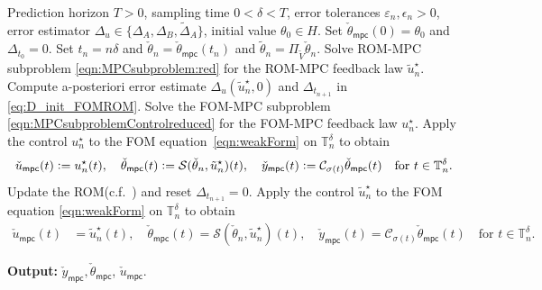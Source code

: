 \documentclass[reqno]{amsart}
\newcommand{\timeInt}{\mathbb{T}}
\newcommand{\state}{\theta}
\newcommand{\inpVar}{u}
\newcommand{\outVar}{y}
\newcommand{\cOper}{\calC}
\newcommand{\errortol}{\epsilon}
\newcommand{\initBoundn}[1]{\Delta_{t_{#1}}}
\newcommand{\optInpVar}[1]{\inpVar_{#1}^\star}
\newcommand{\optInpVarN}{\optInpVar{n}}
\newcommand{\switch}{\sigma}
\newcommand{\reduce}[1]{\tilde{#1}}
\newcommand{\Vred}{\reduce{V}}
\newcommand{\projVred}{\Pi_{\Vred}}
\newcommand{\BoundControlA}{\Delta_{A}}
\newcommand{\BoundControlB}{\Delta_{B}}
\newcommand{\BoundControlAtil}{\tilde\Delta_{A}}
\newcommand{\stateRed}{\reduce{\state}}
\newcommand{\optInpVarRed}[1]{\reduce{\inpVar}_{#1}^\star}
\newcommand{\optInpVarRedN}{\optInpVarRed{n}}
\newcommand{\intermediateState}{\check{\state}}
\newcommand{\intermediateStateMPC}
{\check{\state}_{\mathsf{mpc}}}
\newcommand{\intermediateOutVarMPC}
{\check{\outVar}_{\mathsf{mpc}}}
\newcommand{\intermediateInpVarMPC}
{\check{\inpVar}_{\mathsf{mpc}}}
\newcommand{\calC}{\mathcal{C}}
\newcommand{\calS}{\mathcal{S}}
\newcommand{\abbr}[1]{\textsf{#1}\xspace}
\newcommand{\FOM}{\abbr{FOM}}
\newcommand{\ROM}{\abbr{ROM}}
\newcommand{\MPC}{\abbr{MPC}}
\begin{document}
\begin{algorithm}[t]
	\caption{\FOM-\ROM-\MPC}\label{alg:ROM-MPC}
	\begin{algorithmic}[1]
		\Require Prediction horizon $T>0$, sampling time $0<\delta<T$, error tolerances $\varepsilon_n,\errortol_n>0$, error estimator $\Delta_u\in \{\BoundControlA,\BoundControlB, \BoundControlAtil\}$, initial value $\state_0\in H$.
        \State Set $\intermediateStateMPC(0) = \state_0$ and $\initBoundn{0}= 0$. 
			\State Set $t_n = n\delta$ and $\intermediateState_n = \intermediateStateMPC(t_n)$ and $\stateRed_n = \projVred \intermediateState_n$.\label{line:alg:FOMROMMPC_initvalue}
            \State Solve \ROM-\MPC subproblem \eqref{eqn:MPCsubproblem:red} for the \ROM-\MPC feedback law $\optInpVarRedN$. 
            \State Compute a-posteriori error estimate $\Delta_u(\optInpVarRedN,0)$ and $\initBoundn{n+1}$ in \eqref{eq:D_init_FOMROM}.
            \If{$\Delta_u(\optInpVarRedN,0)>\varepsilon_n$ or $\initBoundn{n+1}>\epsilon_n$}\label{alg:line:ErrorEstCrit}
                 \State Solve the \FOM-\MPC subproblem \eqref{eqn:MPCsubproblemControlreduced} for the \FOM-\MPC feedback law $\optInpVarN$. 
		          \State Apply the control $\optInpVarN$ to the \FOM equation~\eqref{eqn:weakForm} on $\timeInt_n^\delta $ to obtain
                 \begin{align*} \intermediateInpVarMPC(t)\vcentcolon=\optInpVarN{(t)}, \quad\intermediateStateMPC (t)\vcentcolon=\calS(\intermediateState_n,\optInpVarRedN)(t),\quad\intermediateOutVarMPC (t)\vcentcolon=\cOper_{\switch{(t)}} \intermediateStateMPC (t)\quad\text{for }t\in \timeInt_n^\delta.
                \end{align*}
                \State Update the \ROM (c.f.~) and reset $\initBoundn{n+1}=0$.
            \Else
                \State \label{algo:line:applyROM}Apply the control $\optInpVarRedN$ to the \FOM equation \eqref{eqn:weakForm} on $\timeInt_n^\delta$ to obtain 
                \begin{align*}
                    \intermediateInpVarMPC(t)& =\optInpVarRedN (t),\quad \intermediateStateMPC(t)=\calS(\intermediateState_n,\optInpVarRedN)(t), \quad\intermediateOutVarMPC(t)=\cOper_{\switch(t)}\intermediateStateMPC(t)\quad\text{for }t\in \timeInt_n^\delta.
                \end{align*}
            \EndIf
        \EndFor
	\end{algorithmic}
    \begin{flushleft}
    \textbf{Output:} $\intermediateOutVarMPC, \intermediateStateMPC$, $\intermediateInpVarMPC$.
    \end{flushleft}
\end{algorithm}
\end{document}
